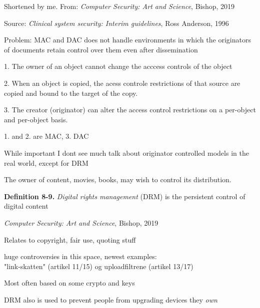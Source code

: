 \documentclass[Screen16to9,17pt]{foils}
\begin{document}
Shortened by me. From:
\emph{Computer Security: Art and Science}, Bishop, 2019


Source:
\emph{Clinical system security: Interim guidelines}, Ross Anderson, 1996



\begin{list1}
\item Problem: MAC and DAC does not handle environments in which the originators of documents retain control over them even after dissemination
\begin{list2}
\item 1. The owner of an object cannot change the acccess controls of the object
\item 2. When an object is copied, the acess controle restrictions of that source are copied and bound to the target of the copy.
\item 3. The creator (originator) can alter the access control restrictions on a per-object and per-object basis.
\end{list2}
\item 1. and 2. are MAC, 3. DAC
\end{list1}

While important I dont see much talk about originator controlled models in the real world, except for DRM


\begin{list1}
\item The owner of content, movies, books, may wish to control its distribution.
\item {\bf Definition 8-9.} \emph{Digital rights management} (DRM) is the persistent control of digital content
\item \emph{Computer Security: Art and Science}, Bishop, 2019
\item Relates to copyright, fair use, quoting stuff
\item huge controversies in this space, newest examples:\\
"link-skatten" (artikel 11/15) og uploadfiltrene (artikel 13/17)
\item Most often based on some crypto and keys
\end{list1}

DRM also is used to prevent people from upgrading devices they \emph{own}
\end{document}
